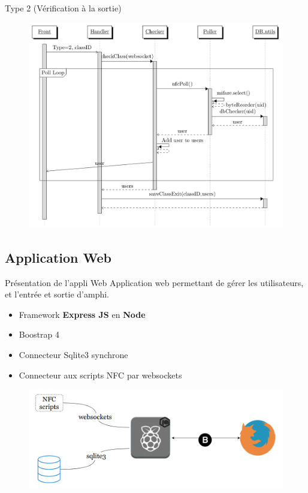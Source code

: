 \documentclass[aspectratio=169]{beamer}
\begin{document}
\begin{frame}{Type 2 (Vérification à la sortie)}
    \begin{figure}[]
        \includegraphics[height=.9\textheight]{../assets/nfcSeqExit.png}
    \end{figure}

\end{frame}

\subsection{Application Web}

\begin{frame}{Présentation de l'appli Web}
    Application web permettant de gérer les utilisateurs, et l'entrée et sortie d'amphi.
    \begin{itemize}
        \item Framework \textbf{Express JS} en \textbf{Node}
        \item Boostrap 4
        \item Connecteur Sqlite3 synchrone
        \item Connecteur aux scripts NFC par websockets
    \end{itemize}

    \begin{figure}
        \centering
        \includegraphics[width=.5\textwidth]{../assets/web_architecture.png}
    \end{figure}
\end{frame}
\end{document}
